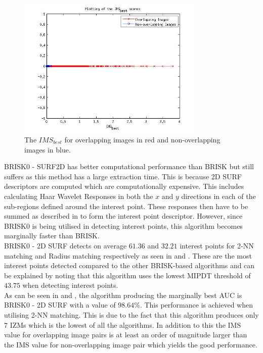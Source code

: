 \documentclass[11pt]{report}
\begin{document}
\begin{figure}
  \centering
    \includegraphics[width=0.8\textwidth]{../Drawings/Matching/MatchingScore_BRISK0UBRISK.jpg}
    \caption{The $IMS_{best}$ for overlapping images in red and non-overlapping images in blue.} 
    \label{fig:separate_ubrisk}
\end{figure}

BRISK0 - SURF2D has better computational performance than BRISK but still suffers as this method has a large extraction time. This is because 2D SURF descriptors are computed which are computationally expensive. This includes calculating Haar Wavelet Responses in both the $x$ and $y$ directions in each of the sub-regions defined around the interest point. These responses then have to be summed as described in  to form the interest point descriptor. However, since BRISK0 is being utilised in detecting interest points, this algorithm becomes marginally faster than BRISK.\\

BRISK0 - 2D SURF detects on average $61.36$ and $32.21$ interest points for 2-NN matching and Radius matching respectively as seen in  and . These are the most interest points detected compared to the other BRISK-based algorithms and can be explained by noting that this algorithm uses the lowest MIPDT threshold of $43.75$ when detecting interest points. \\

As can be seen in  and , the algorithm producing the marginally best AUC is BRISK0 - 2D SURF with a value of $98.64\%$. This performance is achieved when utilising 2-NN matching. This is due to the fact that this algorithm produces only $7$ IZMs which is the lowest of all the algorithms. In addition to this the IMS value for overlapping image pairs is at least an order of magnitude larger than the IMS value for non-overlapping image pair which yields the good performance. \\
\end{document}
